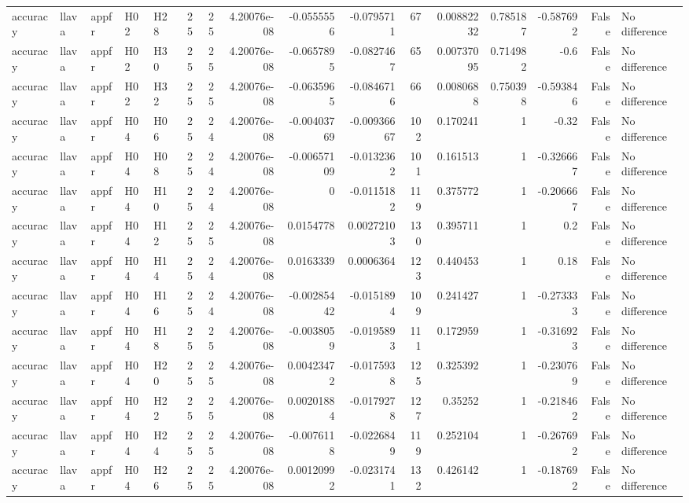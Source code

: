 \begin{longtable}{lllllrrrrrrrrrrl}
accuracy & llava & appfr & H02 & H28 & 25 & 25 & 4.20076e-08 & -0.0555556 & -0.0795711 & 67 & 0.00882232 & 0.785187 & -0.587692 & False & No difference \\
accuracy & llava & appfr & H02 & H30 & 25 & 25 & 4.20076e-08 & -0.0657895 & -0.0827467 & 65 & 0.00737095 & 0.714982 & -0.6 & False & No difference \\
accuracy & llava & appfr & H02 & H32 & 25 & 25 & 4.20076e-08 & -0.0635965 & -0.0846716 & 66 & 0.0080688 & 0.750398 & -0.593846 & False & No difference \\
accuracy & llava & appfr & H04 & H06 & 25 & 24 & 4.20076e-08 & -0.00403769 & -0.00936667 & 102 & 0.170241 & 1 & -0.32 & False & No difference \\
accuracy & llava & appfr & H04 & H08 & 25 & 24 & 4.20076e-08 & -0.00657109 & -0.0132362 & 101 & 0.161513 & 1 & -0.326667 & False & No difference \\
accuracy & llava & appfr & H04 & H10 & 25 & 24 & 4.20076e-08 & 0 & -0.0115182 & 119 & 0.375772 & 1 & -0.206667 & False & No difference \\
accuracy & llava & appfr & H04 & H12 & 25 & 25 & 4.20076e-08 & 0.0154778 & 0.00272103 & 130 & 0.395711 & 1 & 0.2 & False & No difference \\
accuracy & llava & appfr & H04 & H14 & 25 & 24 & 4.20076e-08 & 0.0163339 & 0.0006364 & 123 & 0.440453 & 1 & 0.18 & False & No difference \\
accuracy & llava & appfr & H04 & H16 & 25 & 24 & 4.20076e-08 & -0.00285442 & -0.0151894 & 109 & 0.241427 & 1 & -0.273333 & False & No difference \\
accuracy & llava & appfr & H04 & H18 & 25 & 25 & 4.20076e-08 & -0.0038059 & -0.0195893 & 111 & 0.172959 & 1 & -0.316923 & False & No difference \\
accuracy & llava & appfr & H04 & H20 & 25 & 25 & 4.20076e-08 & 0.00423472 & -0.0175938 & 125 & 0.325392 & 1 & -0.230769 & False & No difference \\
accuracy & llava & appfr & H04 & H22 & 25 & 25 & 4.20076e-08 & 0.00201884 & -0.0179278 & 127 & 0.35252 & 1 & -0.218462 & False & No difference \\
accuracy & llava & appfr & H04 & H24 & 25 & 25 & 4.20076e-08 & -0.0076118 & -0.0226849 & 119 & 0.252104 & 1 & -0.267692 & False & No difference \\
accuracy & llava & appfr & H04 & H26 & 25 & 25 & 4.20076e-08 & 0.00120992 & -0.0231741 & 132 & 0.426142 & 1 & -0.187692 & False & No difference \\

\end{longtable}
